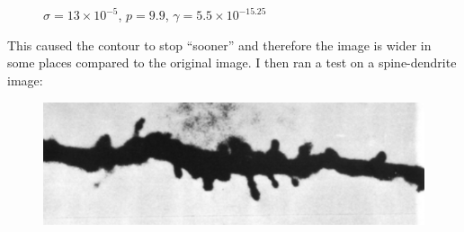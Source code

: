 \documentclass[margin=1in,12pt,3p]{elsarticle}
\begin{document}
\begin{figure}[h!]
  \centering
  \hfill
  \\
  \\
  \caption{$\sigma = 13\times 10^{-5}$, $p = 9.9$, $\gamma=5.5\times 10^{-15.25}$}
\end{figure}
This caused the contour to stop ``sooner'' and therefore the image is wider in some places compared to the original image. I then ran a test on a spine-dendrite image:
\clearpage
\begin{figure}[h!]
    \centering
    \includegraphics[width=\linewidth]{imagedend.png}
\end{figure}
\end{document}
